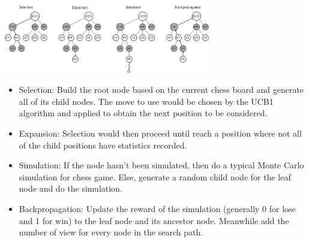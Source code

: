 \documentclass[12pt,a4paper]{article}
\makeatletter
\newenvironment{figurehere} {\def\@captype{figure}} {}
\makeatother
\begin{document}
\begin{figurehere}
\centering
\includegraphics[width=90mm]{1.png}
\end{figurehere}
\begin{itemize}
\item Selection:
Build the root node based on the current chess board and generate all of its child nodes. The move to use would be chosen by the UCB1 algorithm and applied to obtain the next position to be considered.
\item Expansion:
Selection would then proceed until reach a position where not all of the child positions have statistics recorded.
\item Simulation:
If the node hasn't been simulated, then do a typical Monte Carlo simulation for chess game. Else, generate a random child node for the leaf node and do the simulation.
\item Backpropagation:
Update the reward of the simulation (generally 0 for lose and 1 for win) to the leaf node and its ancestor node. Meanwhile add the number of view for every node in the search path.
\end{itemize}
\end{document}
